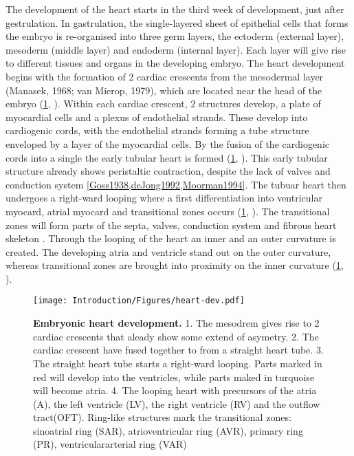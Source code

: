 The development of the heart starts in the third week of development, just after gestrulation. In gastrulation, the single-layered sheet of epithelial cells that forms the embryo is re-organised into three germ layers, the ectoderm (external layer), mesoderm  (middle layer) and endoderm (internal layer). Each layer will give rise to different tissues and organs in the developing embryo. The heart development begins with the formation of \num{2} cardiac crescents from the mesodermal layer (Manasek, 1968; van Mierop, 1979), which are located near the head of the embryo (\cref{fig:dev-heart}, ). Within each cardiac crescent, \num{2} structures develop, a plate of myocardial cells and a plexus of endothelial strands. These develop into cardiogenic cords, with the endothelial strands forming a tube structure enveloped  by a layer of the myocardial cells. By the fusion of the cardiogenic cords into a single the early tubular heart is formed (\cref{fig:dev-heart}, ). This early tubular structure already shows peristaltic contraction, despite the lack of valves and conduction system \cref{Goss1938,deJong1992,Moorman1994}. The tubuar heart then undergoes a right-ward looping where a first differentiation into ventricular myocard, atrial myocard and transitional zones occurs (\cref{fig:dev-heart}, ). The transitional zones will form parts of the septa, valves, conduction system and fibrous heart skeleton \citep{Gittenberger-de Groot2005}. Through the looping of the heart an inner and an outer curvature is created. The developing atria and ventricle stand out on the outer curvature, whereas transitional zones are brought into proximity on the inner curvature (\cref{fig:dev-heart}, ). 

\begin{figure}[hbtp]
	\centering
	\texttt{[image: Introduction/Figures/heart-dev.pdf]}
	\caption[\textbf{Embryonic heart development. }]{\textbf{Embryonic heart development. } 1. The mesodrem gives rise to \num{2} cardiac crescents that aleady show some extend of asymetry. 2. The cardiac crescent have fused together to from a straight heart tube. 3. The straight heart tube starts a right-ward looping. Parts marked in red will develop into the ventricles, while parts maked in turquoise will become atria. 4. The looping heart with precursors of the atria (A), the left ventricle (LV), the right ventricle (RV) and the outflow tract(OFT). Ring-like structures mark the transitional zones: sinoatrial ring (SAR), atrioventricular ring (AVR), primary ring (PR), ventriculararterial ring (VAR)} 
	 	\label{fig:dev-heart}
\end{figure}

